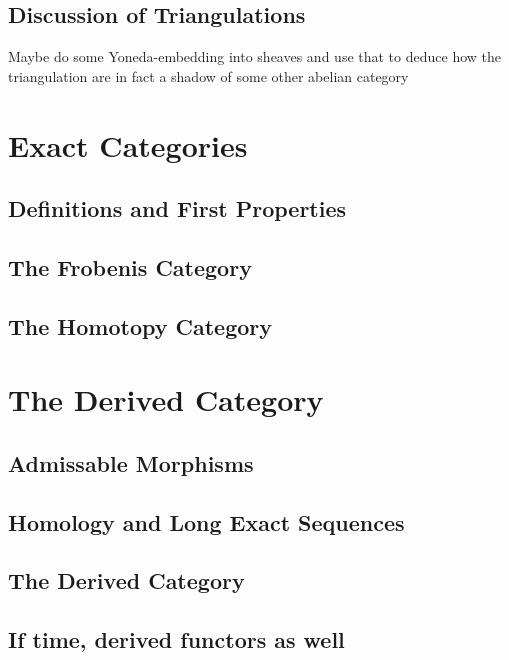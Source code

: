 \documentclass[12pt]{article}
\theoremstyle{definition}
\theoremstyle{remark}
\begin{document}
        \subsection{Discussion of Triangulations}
            Maybe do some Yoneda-embedding into sheaves and use that to deduce how the triangulation are in fact a shadow of some other abelian category
    
    \clearpage
    
    \section{Exact Categories}

            \subsection{Definitions and First Properties}

            \subsection{The Frobenis Category}

            \subsection{The Homotopy Category}

    \clearpage

    \section{The Derived Category}

            \subsection{Admissable Morphisms}

            \subsection{Homology and Long Exact Sequences}

            \subsection{The Derived Category}

            \subsection{If time, derived functors as well}
\end{document}
